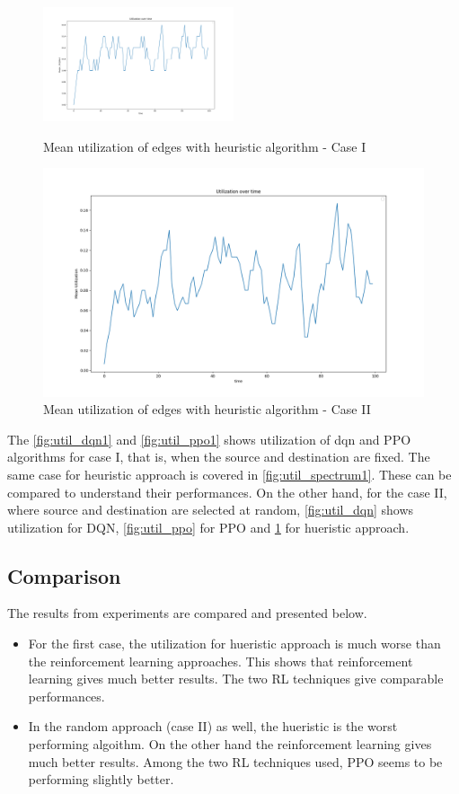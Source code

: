 \documentclass[conference]{IEEEtran}
\begin{document}
\begin{figure}[ht]
  \centering
  \includegraphics[width=0.5\textwidth]{util_spectrum1.png}
  \caption{Mean utilization of edges with heuristic algorithm - Case I}
  \label{fig:util_spectrum1}

  \includegraphics[width=\linewidth]{util_spectrum.png}
  \caption{Mean utilization of edges with heuristic algorithm - Case II}
  \label{fig:util_spectrum}
\end{figure}



The \ref{fig:util_dqn1} and \ref{fig:util_ppo1} shows utilization of dqn and PPO algorithms for case I, that is, when the source and destination are fixed. The same case for heuristic approach is covered in  \ref{fig:util_spectrum1}. These can be compared to understand their performances. On the other hand, for the case II, where source and destination are selected at random, \ref{fig:util_dqn} shows utilization for DQN, \ref{fig:util_ppo} for PPO and \ref{fig:util_spectrum} for hueristic approach. 


\subsection{Comparison}
The results from experiments are compared and presented below.

\begin{itemize}
    \item For the first case, the utilization for hueristic approach is much worse than the reinforcement learning approaches. This shows that reinforcement learning gives much better results. The two RL techniques give comparable performances.
    \item In the random approach (case II) as well, the hueristic is the worst performing algoithm. On the other hand the reinforcement learning gives much better results. Among the two RL techniques used, PPO seems to be performing slightly better.
\end{itemize}






\end{document}
